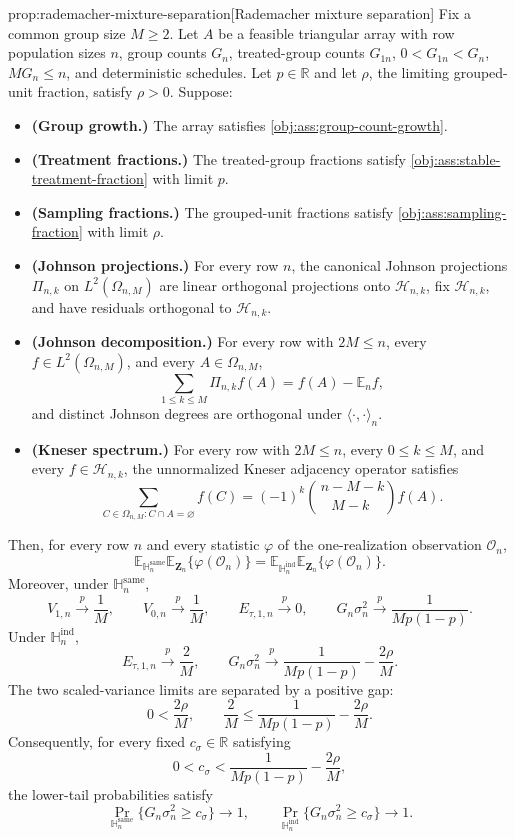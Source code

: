 \documentclass[11pt]{article}
\begin{document}
\begin{propositionv}{prop:rademacher-mixture-separation}[Rademacher mixture separation]
Fix a common group size \(M\ge 2\).  Let \(A\) be a feasible triangular array with row population sizes \(n\), group counts \(G_n\), treated-group counts \(G_{1n}\), \(0<G_{1n}<G_n\), \(M G_n\le n\), and deterministic schedules.  Let \(p\in\mathbb R\) and let \(\rho\), the limiting grouped-unit fraction, satisfy \(\rho>0\).  Suppose:
\begin{itemize}
\item \textbf{(Group growth.)} The array satisfies \cref{obj:ass:group-count-growth}.
\item \textbf{(Treatment fractions.)} The treated-group fractions satisfy \cref{obj:ass:stable-treatment-fraction} with limit \(p\).
\item \textbf{(Sampling fractions.)} The grouped-unit fractions satisfy \cref{obj:ass:sampling-fraction} with limit \(\rho\).
\item \textbf{(Johnson projections.)} For every row \(n\), the canonical Johnson projections \(\Pi_{n,k}\) on \(L^2(\Omega_{n,M})\) are linear orthogonal projections onto \(\mathcal H_{n,k}\), fix \(\mathcal H_{n,k}\), and have residuals orthogonal to \(\mathcal H_{n,k}\).
\item \textbf{(Johnson decomposition.)} For every row with \(2M\le n\), every \(f\in L^2(\Omega_{n,M})\), and every \(A\in\Omega_{n,M}\),
\[
\sum_{1\le k\le M}\Pi_{n,k}f(A)=f(A)-\mathbb E_n f,
\]
and distinct Johnson degrees are orthogonal under \(\langle\cdot,\cdot\rangle_n\).
\item \textbf{(Kneser spectrum.)} For every row with \(2M\le n\), every \(0\le k\le M\), and every \(f\in\mathcal H_{n,k}\), the unnormalized Kneser adjacency operator satisfies
\[
\sum_{C\in\Omega_{n,M}:C\cap A=\varnothing} f(C)
=
(-1)^k {\,n-M-k\choose M-k\,} f(A).
\]
\end{itemize}
Then, for every row \(n\) and every statistic \(\varphi\) of the one-realization observation \(\mathcal O_n\),
\[
\mathbb E_{\mathbb H_n^{\mathrm{same}}}\mathbb E_{\mathbf Z_n}\{\varphi(\mathcal O_n)\}
=
\mathbb E_{\mathbb H_n^{\mathrm{ind}}}\mathbb E_{\mathbf Z_n}\{\varphi(\mathcal O_n)\}.
\]
Moreover, under \(\mathbb H_n^{\mathrm{same}}\),
\[
V_{1,n}\stackrel{p}{\longrightarrow}\frac1M,
\qquad
V_{0,n}\stackrel{p}{\longrightarrow}\frac1M,
\qquad
E_{\tau,1,n}\stackrel{p}{\longrightarrow}0,
\qquad
G_n\sigma_n^2\stackrel{p}{\longrightarrow}\frac{1}{M p(1-p)}.
\]
Under \(\mathbb H_n^{\mathrm{ind}}\),
\[
E_{\tau,1,n}\stackrel{p}{\longrightarrow}\frac2M,
\qquad
G_n\sigma_n^2\stackrel{p}{\longrightarrow}\frac{1}{M p(1-p)}-\frac{2\rho}{M}.
\]
The two scaled-variance limits are separated by a positive gap:
\[
0<\frac{2\rho}{M},
\qquad
\frac2M\le \frac{1}{M p(1-p)}-\frac{2\rho}{M}.
\]
Consequently, for every fixed \(c_\sigma\in\mathbb R\) satisfying
\[
0<c_\sigma<\frac{1}{M p(1-p)}-\frac{2\rho}{M},
\]
the lower-tail probabilities satisfy
\[
\Pr_{\mathbb H_n^{\mathrm{same}}}\{G_n\sigma_n^2\ge c_\sigma\}\to 1,
\qquad
\Pr_{\mathbb H_n^{\mathrm{ind}}}\{G_n\sigma_n^2\ge c_\sigma\}\to 1.
\]
\end{propositionv}
\end{document}
